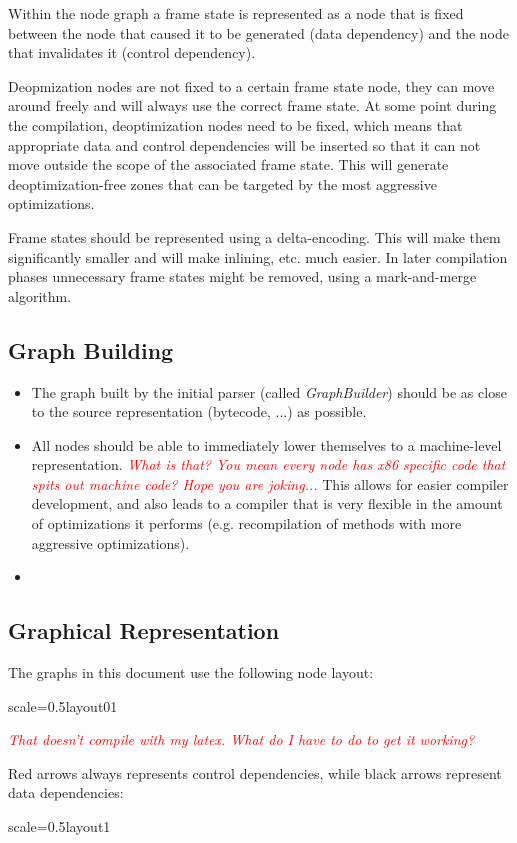 \documentclass[twocolumn]{svjour3}
\newcommand{\mynote}[2]{
\textcolor{red}{\fbox{\bfseries\sffamily\scriptsize#1}
  {\small\textsf{\emph{#2}}}
\fbox{\bfseries\sffamily\scriptsize }}}
\newcommand\cw[1]{\mynote{CW}{#1}}
\begin{document}
Within the node graph a frame state is represented as a node that is fixed between the node that caused it to be generated (data dependency) and the node that invalidates it (control dependency).

Deopmization nodes are not fixed to a certain frame state node, they can move around freely and will always use the correct frame state.
At some point during the compilation, deoptimization nodes need to be fixed, which means that appropriate data and control dependencies will be inserted so that it can not move outside the scope of the associated frame state.
This will generate deoptimization-free zones that can be targeted by the most aggressive optimizations.

Frame states should be represented using a delta-encoding.
This will make them significantly smaller and will make inlining, etc. much easier.
In later compilation phases unnecessary frame states might be removed, using a mark-and-merge algorithm.



\subsection{Graph Building}
\begin{itemize}
    \item The graph built by the initial parser (called \emph{GraphBuilder}) should be as close to the source representation (bytecode, ...) as possible.
    \item All nodes should be able to immediately lower themselves to a machine-level representation. \cw{What is that?  You mean every node has x86 specific code that spits out machine code?  Hope you are joking...} This allows for easier compiler development, and also leads to a compiler that is very flexible in the amount of optimizations it performs (e.g. recompilation of methods with more aggressive optimizations).
    \item 
\end{itemize}

\subsection{Graphical Representation}
The graphs in this document use the following node layout:

\begin{digraphenv}{scale=0.5}{layout01}
\end{digraphenv}

\cw{That doesn't compile with my latex.  What do I have to do to get it working?}

Red arrows always represents control dependencies, while black arrows represent data dependencies:

\begin{digraphenv}{scale=0.5}{layout1}
\end{digraphenv}
\end{document}
